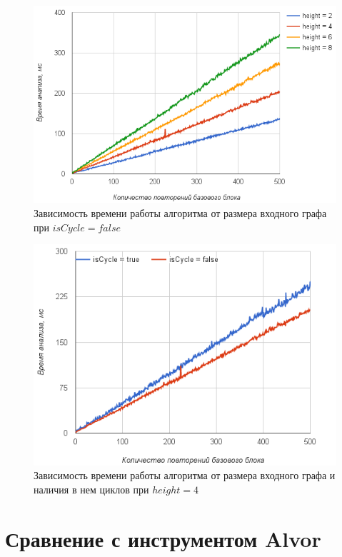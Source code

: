 \begin{figure}[h!]
 \centering
 \includegraphics[width=15cm]{pics/diffheights.png}
 \caption{Зависимость времени работы алгоритма от размера входного графа при $isCycle=false$}
 \label{diffheights}
\end{figure}

\begin{figure}[h!]
 \centering
 \includegraphics[width=13cm]{pics/heigh4.png}
 \caption{Зависимость времени работы алгоритма от размера входного графа и наличия в нем циклов при $height=4$}
 \label{CycleVsLinear}
\end{figure}


\section{Сравнение с инструментом Alvor}

